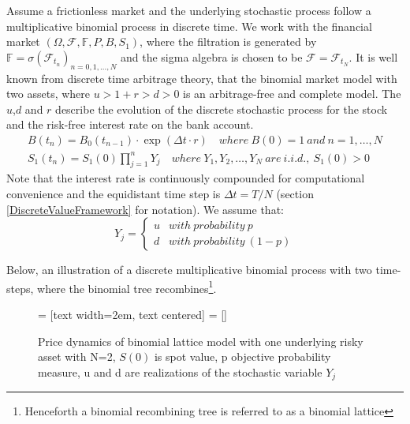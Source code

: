 Assume a frictionless market and the underlying stochastic process follow a multiplicative binomial process in discrete time. We work with the financial market $(\Omega, \mathcal{F}, \mathbb{F}, P, B, S_1)$, where the filtration is generated by $\mathbb{F}= \sigma(\mathcal{F}_{t_n})_{n=0,1,\ldots, N}$ and the sigma algebra is chosen to be $\mathcal{F}=\mathcal{F}_{t_{N}}$. It is well known from discrete time arbitrage theory, that the binomial market model with two assets, where $u>1+r>d>0$ is an arbitrage-free and complete model. The $u$,$d$ and $r$ describe the evolution of the discrete stochastic process for the stock and the risk-free interest rate on the bank account. 
\begin{align*}
B(t_n)=B_{0}(t_{n-1}) \cdot \exp(\Delta t \cdot r) \quad where \ B(0)=1 \ and \ n=1, \ldots, N\\
S_{1}(t_n)=S_{1}(0)\prod_{j=1}^{n} Y_{j} \quad where \ Y_1,Y_2, \ldots, Y_N \ are \ i.i.d., \ S_1(0)>0
\end{align*}
Note that the interest rate is continuously compounded for computational convenience and the equidistant time step is $\Delta t=T/N$ (section \ref{DiscreteValueFramework} for notation). We assume that: \[ Y_j = \begin{cases} 
      u & with \ probability \ p \\
      d & with \ probability \ (1-p)
   \end{cases}
\]

Below, an illustration of a discrete multiplicative binomial process with two time-steps, where the binomial tree recombines\footnote{Henceforth a binomial recombining tree is referred to as a binomial lattice}.\\

\begin{figure}[H]
\centering
 = [text width=2em, text centered]
 = []
\decoRule
\caption[Two-dimensional Binomial Lattice]{Price dynamics of binomial lattice model with one underlying risky asset with N=2, $S(0)$ is spot value, p objective probability measure, u and d are realizations of the stochastic variable $Y_j$}
\label{fig:twoDimLattice}
\end{figure}

